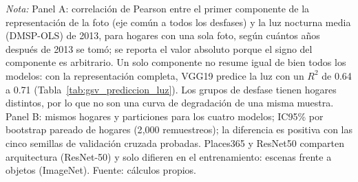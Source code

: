 \begin{table}[H]
\begin{minipage}{0.95\textwidth}
    \footnotesize \textit{Nota:} Panel A: correlación de Pearson entre el primer componente de la representación de la foto (eje común a todos los desfases) y la luz nocturna media (DMSP-OLS) de 2013, para hogares con una sola foto, según cuántos años después de 2013 se tomó; se reporta el valor absoluto porque el signo del componente es arbitrario. Un solo componente no resume igual de bien todos los modelos: con la representación completa, VGG19 predice la luz con un $R^2$ de 0.64 a 0.71 (Tabla~\ref{tab:gsv_prediccion_luz}). Los grupos de desfase tienen hogares distintos, por lo que no son una curva de degradación de una misma muestra. Panel B: mismos hogares y particiones para los cuatro modelos; IC95\% por bootstrap pareado de hogares (2{,}000 remuestreos); la diferencia es positiva con las cinco semillas de validación cruzada probadas. Places365 y ResNet50 comparten arquitectura (ResNet-50) y solo difieren en el entrenamiento: escenas frente a objetos (ImageNet). Fuente: cálculos propios.
  \end{minipage}
\end{table}
